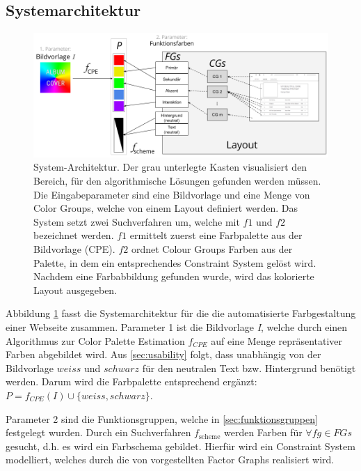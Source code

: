 \subsection{Systemarchitektur}
\label{sec:architektur}

\begin{figure}
	\centering
	\includegraphics[width=1\textwidth]{img/architecture.png}
	\caption{System-Architektur. Der grau unterlegte Kasten visualisiert den Bereich, für den algorithmische Lösungen gefunden werden müssen. Die Eingabeparameter sind eine Bildvorlage und eine Menge von Color Groups, welche von einem Layout definiert werden. Das System setzt zwei Suchverfahren um, welche mit $f1$ und $f2$ bezeichnet werden. $f1$ ermittelt zuerst eine Farbpalette aus der Bildvorlage (CPE). $f2$ ordnet Colour Groups Farben aus der Palette, in dem ein entsprechendes Constraint System gelöst wird. Nachdem eine Farbabbildung gefunden wurde, wird das kolorierte Layout ausgegeben.}
	\label{fig:architecture}
\end{figure}

Abbildung \ref{fig:architecture} fasst die Systemarchitektur für die die automatisierte Farbgestaltung einer Webseite zusammen. Parameter 1 ist die Bildvorlage \emph{I}, welche durch einen Algorithmus zur Color Palette Estimation $f_{CPE}$ auf eine Menge repräsentativer Farben abgebildet wird. Aus \autoref{sec:usability} folgt, dass unabhängig von der Bildvorlage $weiss$ und $schwarz$ für den neutralen Text bzw. Hintergrund benötigt werden. Darum wird die Farbpalette entsprechend ergänzt: $P = f_{CPE}(I) \cup \{weiss, schwarz\}$.

Parameter 2 sind die Funktionsgruppen, welche in \autoref{sec:funktionsgruppen} festgelegt wurden. Durch ein Suchverfahren $f_\text{scheme}$ werden Farben für $\forall fg \in FGs$ gesucht, d.h. es wird ein Farbschema gebildet. Hierfür wird ein Constraint System modelliert, welches durch die von \citet{patterns} vorgestellten Factor Graphs realisiert wird.

